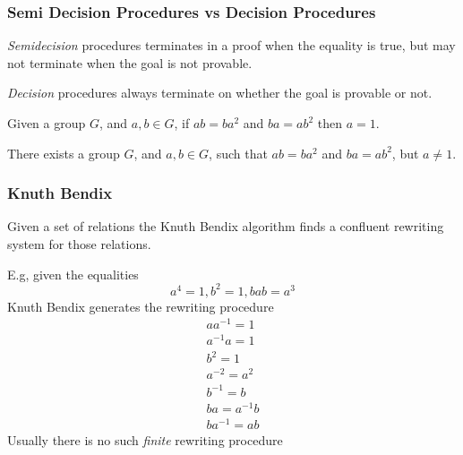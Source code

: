 \documentclass{beamer}
\begin{document}
\begin{frame}
  \frametitle{Semi Decision Procedures vs Decision Procedures}

  \textit{Semidecision} procedures terminates in a proof when the equality is true, but may not terminate
  when the goal is not provable. \newline

  \textit{Decision} procedures always terminate on whether the goal is provable or not.

\end{frame}

\begin{frame}
  Given a group $G$, and $a, b \in G$, if $ab=ba^2$ and $ba=ab^2$ then $a=1$. \newline

  There exists a group $G$, and $a, b \in G$, such that
    $ab=ba^2$ and $ba=ab^2$, but $a \ne 1$.
\end{frame}

\begin{frame}
  \frametitle{Knuth Bendix}
  Given a set of relations the Knuth Bendix algorithm finds a confluent rewriting system
  for those relations.

  E.g, given the equalities
  \begin{equation*}
     a^4 = 1, b^2 = 1, bab=a^3
  \end{equation*}
  Knuth Bendix generates the rewriting procedure
  \begin{equation*}
    \begin{aligned}
    aa^{-1} = 1 \\
    a^{-1}a = 1 \\
    b^2 = 1 \\
    a^{-2} = a^2 \\
    b^{-1} = b \\
    ba = a^{-1}b \\
    ba^{-1} = ab
    \end{aligned}
  \end{equation*}
Usually there is no such \textit{finite} rewriting procedure
\end{frame}
\end{document}
